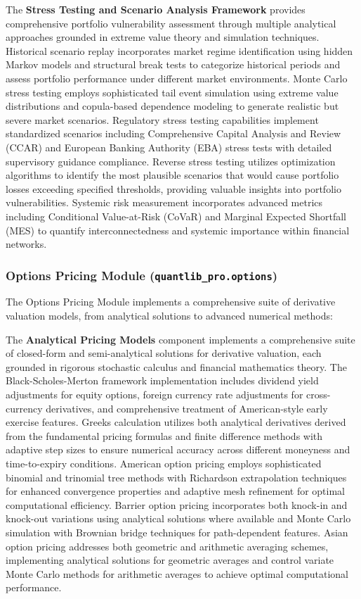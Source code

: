\documentclass[12pt,a4paper]{article}
\theoremstyle{definition}
\theoremstyle{remark}
\begin{document}
The \textbf{Stress Testing and Scenario Analysis Framework} provides comprehensive portfolio vulnerability assessment through multiple analytical approaches grounded in extreme value theory and simulation techniques. Historical scenario replay incorporates market regime identification using hidden Markov models and structural break tests to categorize historical periods and assess portfolio performance under different market environments. Monte Carlo stress testing employs sophisticated tail event simulation using extreme value distributions and copula-based dependence modeling to generate realistic but severe market scenarios. Regulatory stress testing capabilities implement standardized scenarios including Comprehensive Capital Analysis and Review (CCAR) and European Banking Authority (EBA) stress tests with detailed supervisory guidance compliance. Reverse stress testing utilizes optimization algorithms to identify the most plausible scenarios that would cause portfolio losses exceeding specified thresholds, providing valuable insights into portfolio vulnerabilities. Systemic risk measurement incorporates advanced metrics including Conditional Value-at-Risk (CoVaR) and Marginal Expected Shortfall (MES) to quantify interconnectedness and systemic importance within financial networks.

\subsubsection{Options Pricing Module (\texttt{quantlib\_pro.options})}

The Options Pricing Module implements a comprehensive suite of derivative valuation models, from analytical solutions to advanced numerical methods:

The \textbf{Analytical Pricing Models} component implements a comprehensive suite of closed-form and semi-analytical solutions for derivative valuation, each grounded in rigorous stochastic calculus and financial mathematics theory. The Black-Scholes-Merton framework implementation includes dividend yield adjustments for equity options, foreign currency rate adjustments for cross-currency derivatives, and comprehensive treatment of American-style early exercise features. Greeks calculation utilizes both analytical derivatives derived from the fundamental pricing formulas and finite difference methods with adaptive step sizes to ensure numerical accuracy across different moneyness and time-to-expiry conditions. American option pricing employs sophisticated binomial and trinomial tree methods with Richardson extrapolation techniques for enhanced convergence properties and adaptive mesh refinement for optimal computational efficiency. Barrier option pricing incorporates both knock-in and knock-out variations using analytical solutions where available and Monte Carlo simulation with Brownian bridge techniques for path-dependent features. Asian option pricing addresses both geometric and arithmetic averaging schemes, implementing analytical solutions for geometric averages and control variate Monte Carlo methods for arithmetic averages to achieve optimal computational performance.
\end{document}
